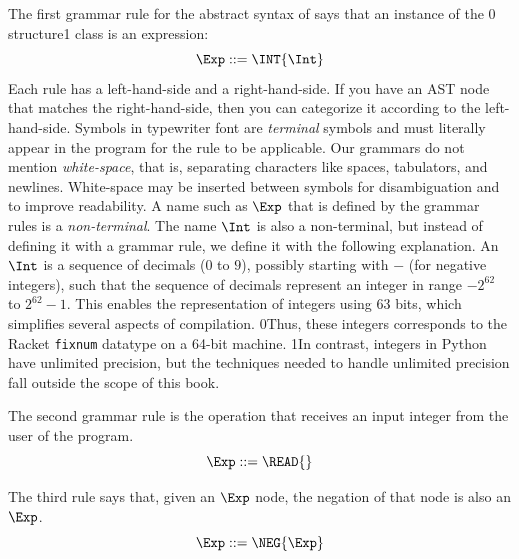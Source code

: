 \documentclass[7x10]{TimesAPriori_MIT}%
\def\racketEd{0}
\def\pythonEd{1}
\def\edition{1}
\newcommand{\racket}[1]{{\if\edition\racketEd{#1}\fi}}
\newcommand{\python}[1]{{\if\edition\pythonEd #1\fi}}
\begin{document}
The first grammar rule for the abstract syntax of \LangInt{} says that an
instance of the \racket{ structure}\python{ class} is an expression:
\begin{equation}
\Exp ::= \INT{\Int}  \label{eq:arith-int}
\end{equation}
%
Each rule has a left-hand-side and a right-hand-side.
If you have an AST node that matches the
right-hand-side, then you can categorize it according to the
left-hand-side.
%
Symbols in typewriter font are \emph{terminal} symbols and must
literally appear in the program for the rule to be applicable.
%
Our grammars do not mention \emph{white-space}, that is, separating characters
like spaces, tabulators, and newlines. White-space may be inserted
between symbols for disambiguation and to improve readability.
%
A name such as $\Exp$ that is defined by the grammar rules is a
\emph{non-terminal}.  
%
The name $\Int$ is also a non-terminal, but instead of defining it
with a grammar rule, we define it with the following explanation.  An
$\Int$ is a sequence of decimals ($0$ to $9$), possibly starting with
$-$ (for negative integers), such that the sequence of decimals
represent an integer in range $-2^{62}$ to $2^{62}-1$.  This enables
the representation of integers using 63 bits, which simplifies several
aspects of compilation. \racket{Thus, these integers corresponds to
  the Racket \texttt{fixnum} datatype on a 64-bit machine.}
\python{In contrast, integers in Python have unlimited precision, but
  the techniques needed to handle unlimited precision fall outside the
  scope of this book.}

The second grammar rule is the \READOP{} operation that receives an
input integer from the user of the program.
\begin{equation}
  \Exp ::= \READ{} \label{eq:arith-read}
\end{equation}

The third rule says that, given an $\Exp$ node, the negation of that
node is also an $\Exp$.
\begin{equation}
  \Exp ::= \NEG{\Exp}  \label{eq:arith-neg}
\end{equation}
\end{document}
